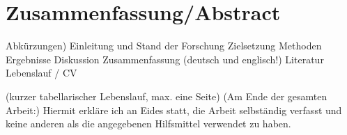 \documentclass[a4paper,12pt]{article}
\begin{document}
\section{Zusammenfassung/Abstract}

\newpage
\listoffigures 
{} 

\newpage
\listoftables
{} 

\lstlistoflistings

\newpage




\newpage 
{}

Abkürzungen)
Einleitung und Stand der Forschung
Zielsetzung
Methoden
Ergebnisse
Diskussion
Zusammenfassung
(deutsch und englisch!)
Literatur
Lebenslauf / CV

(kurzer tabellarischer Lebenslauf, max. eine Seite)
(Am Ende der gesamten Arbeit:)
Hiermit erkläre ich an Eides statt, die Arbeit selbständig verfasst und keine anderen
als die angegebenen Hilfsmittel verwendet zu haben.


\end{document}

